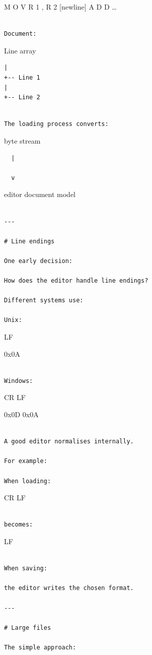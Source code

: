 \documentclass[
  oneside,
  openany]{book}
\begin{document}
M O V R 1 , R 2 {[}newline{]} A D D \ldots{}

\begin{verbatim}

Document:
\end{verbatim}

Line array

\begin{verbatim}
|
+-- Line 1
|
+-- Line 2
\end{verbatim}

\begin{verbatim}

The loading process converts:
\end{verbatim}

byte stream

\begin{verbatim}
  |

  v
\end{verbatim}

editor document model

\begin{verbatim}

---

# Line endings

One early decision:

How does the editor handle line endings?

Different systems use:

Unix:
\end{verbatim}

LF

0x0A

\begin{verbatim}

Windows:
\end{verbatim}

CR LF

0x0D 0x0A

\begin{verbatim}

A good editor normalises internally.

For example:

When loading:
\end{verbatim}

CR LF

\begin{verbatim}

becomes:
\end{verbatim}

LF

\begin{verbatim}

When saving:

the editor writes the chosen format.

---

# Large files

The simple approach:
\end{verbatim}
\end{document}
